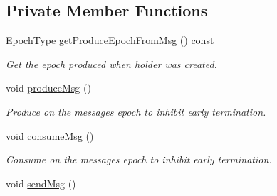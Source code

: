 \subsection*{Private Member Functions}
\begin{DoxyCompactItemize}
\item 
\hyperlink{namespacevt_a985a5adf291c34a3ca263b3378388236}{Epoch\+Type} \hyperlink{structvt_1_1messaging_1_1_pending_send_a8293dffe4d8cdc81de573d2edf0ee4cb}{get\+Produce\+Epoch\+From\+Msg} () const
\begin{DoxyCompactList}\small\item\em Get the epoch produced when holder was created. \end{DoxyCompactList}\item 
void \hyperlink{structvt_1_1messaging_1_1_pending_send_af5961bb21b4a427732be91ac699d570b}{produce\+Msg} ()
\begin{DoxyCompactList}\small\item\em Produce on the messages epoch to inhibit early termination. \end{DoxyCompactList}\item 
void \hyperlink{structvt_1_1messaging_1_1_pending_send_a0f249a127a798ba0823fae82c925ed3b}{consume\+Msg} ()
\begin{DoxyCompactList}\small\item\em Consume on the messages epoch to inhibit early termination. \end{DoxyCompactList}\item 
void \hyperlink{structvt_1_1messaging_1_1_pending_send_a93da625c74a5d35ca0b7dec3fad86152}{send\+Msg} ()
\end{DoxyCompactItemize}
